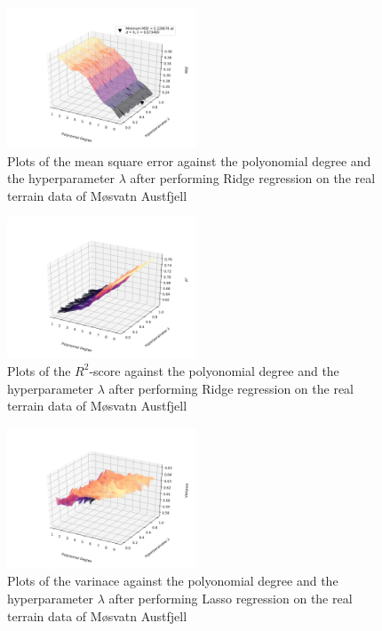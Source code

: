 \documentclass[a4paper,10pt,english]{article}
\begin{document}
\begin{figure}[H]
	\centering 
	\includegraphics[width = 0.5\textwidth, center]{../real_output/part_D_2.png}
	\caption{
		Plots of the mean square error against the polyonomial degree and the hyperparameter $\lambda$ after performing Ridge regression on the real terrain data of Møsvatn Austfjell 
	}
	\label{part_g_d2}
\end{figure}

\begin{figure}[H]
	\centering 
	\includegraphics[width = 0.5\textwidth, center]{../real_output/part_D_3.png}
	\caption{
		Plots of the $R^2$-score against the polyonomial degree and the hyperparameter $\lambda$ after performing Ridge regression on the real terrain data of Møsvatn Austfjell
	}
	\label{part_g_d3}
\end{figure}



\begin{figure}[H]
	\centering 
	\includegraphics[width = 0.5\textwidth, center]{../real_output/part_E_1.png}
	\caption{
		Plots of the varinace against the polyonomial degree and the hyperparameter $\lambda$ after performing Lasso regression on the real terrain data of Møsvatn Austfjell
	}
	\label{part_g_e1}
\end{figure}
\end{document}
